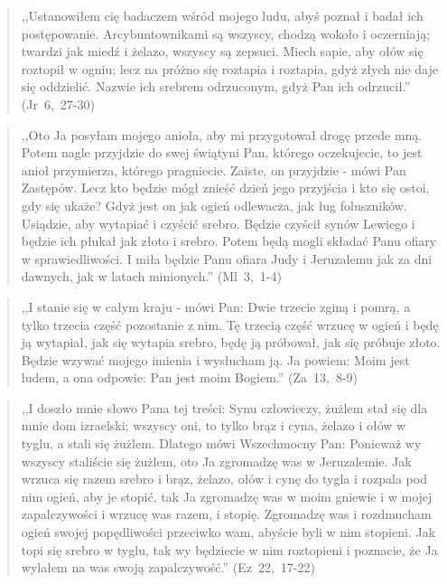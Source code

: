 \documentclass[10pt,a4paper,oneside]{article}
\begin{document}
\begin{quote}
,,Ustanowiłem cię badaczem wśród mojego ludu, abyś poznał i badał ich postępowanie. Arcybuntownikami są wszyscy, chodzą wokoło i oczerniają; twardzi jak miedź i żelazo, wszyscy są zepsuci. Miech sapie, aby ołów się roztopił w ogniu; lecz na próżno się roztapia i roztapia, gdyż złych nie daje się oddzielić. Nazwie ich srebrem odrzuconym, gdyż Pan ich odrzucił.'' \mbox{(Jr 6, 27-30)}
\end{quote}
\begin{quote}
,,Oto Ja posyłam mojego anioła, aby mi przygotował drogę przede mną. Potem nagle przyjdzie do swej świątyni Pan, którego oczekujecie, to jest anioł przymierza, którego pragniecie. Zaiste, on przyjdzie - mówi Pan Zastępów. Lecz kto będzie mógł znieść dzień jego przyjścia i kto się ostoi, gdy się ukaże? Gdyż jest on jak ogień odlewacza, jak ług foluszników. Usiądzie, aby wytapiać i czyścić srebro. Będzie czyścił synów Lewiego i będzie ich płukał jak złoto i srebro. Potem będą mogli składać Panu ofiary w sprawiedliwości. I miła będzie Panu ofiara Judy i Jeruzalemu jak za dni dawnych, jak w latach minionych.'' \mbox{(Ml 3, 1-4)}
\end{quote}
\begin{quote}
,,I stanie się w całym kraju - mówi Pan: Dwie trzecie zginą i pomrą, a tylko trzecia część pozostanie z nim. Tę trzecią część wrzucę w ogień i będę ją wytapiał, jak się wytapia srebro, będę ją próbował, jak się próbuje złoto. Będzie wzywać mojego imienia i wysłucham ją. Ja powiem: Moim jest ludem, a ona odpowie: Pan jest moim Bogiem.'' \mbox{(Za 13, 8-9)}
\end{quote}
\begin{quote}
,,I doszło mnie słowo Pana tej treści: Synu człowieczy, żużlem stał się dla mnie dom izraelski; wszyscy oni, to tylko brąz i cyna, żelazo i ołów w tyglu, a stali się żużlem. Dlatego mówi Wszechmocny Pan: Ponieważ wy wszyscy staliście się żużlem, oto Ja zgromadzę was w Jeruzalemie. Jak wrzuca się razem srebro i brąz, żelazo, ołów i cynę do tygla i rozpala pod nim ogień, aby je stopić, tak Ja zgromadzę was w moim gniewie i w mojej zapalczywości i wrzucę was razem, i stopię. Zgromadzę was i rozdmucham ogień swojej popędliwości przeciwko wam, abyście byli w nim stopieni. Jak topi się srebro w tyglu, tak wy będziecie w nim roztopieni i poznacie, że Ja wylałem na was swoją zapalczywość.'' \mbox{(Ez 22, 17-22)}
\end{quote}
\end{document}
